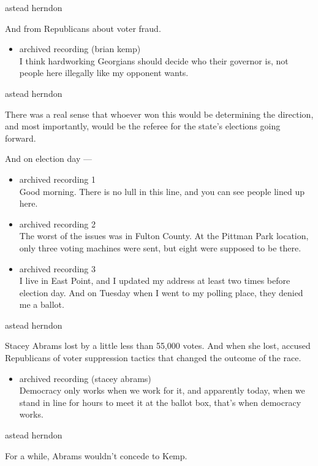 astead herndon

And from Republicans about voter fraud.

\begin{itemize}
\tightlist
\item
  archived recording (brian kemp)\\
  I think hardworking Georgians should decide who their governor is, not
  people here illegally like my opponent wants.
\end{itemize}

astead herndon

There was a real sense that whoever won this would be determining the
direction, and most importantly, would be the referee for the state's
elections going forward.

And on election day ---

\begin{itemize}
\item
  archived recording 1\\
  Good morning. There is no lull in this line, and you can see people
  lined up here.
\item
  archived recording 2\\
  The worst of the issues was in Fulton County. At the Pittman Park
  location, only three voting machines were sent, but eight were
  supposed to be there.
\item
  archived recording 3\\
  I live in East Point, and I updated my address at least two times
  before election day. And on Tuesday when I went to my polling place,
  they denied me a ballot.
\end{itemize}

astead herndon

Stacey Abrams lost by a little less than 55,000 votes. And when she
lost, accused Republicans of voter suppression tactics that changed the
outcome of the race.

\begin{itemize}
\tightlist
\item
  archived recording (stacey abrams)\\
  Democracy only works when we work for it, and apparently today, when
  we stand in line for hours to meet it at the ballot box, that's when
  democracy works.
\end{itemize}

astead herndon

For a while, Abrams wouldn't concede to Kemp.

